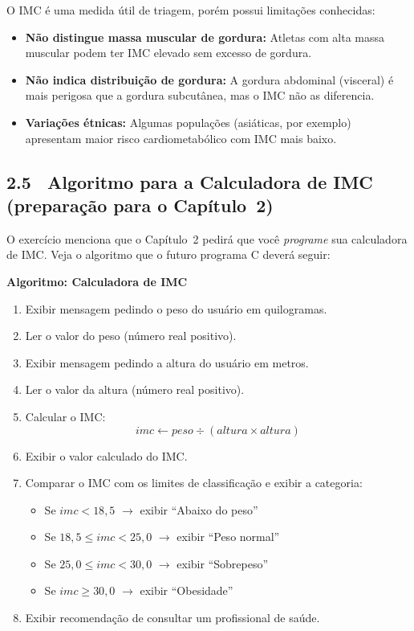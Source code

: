 \documentclass[12pt,a4paper]{article}
\begin{document}
O IMC é uma medida útil de triagem, porém possui limitações conhecidas:
\begin{itemize}
  \item \textbf{Não distingue massa muscular de gordura:} Atletas com alta massa
  muscular podem ter IMC elevado sem excesso de gordura.
  \item \textbf{Não indica distribuição de gordura:} A gordura abdominal (visceral)
  é mais perigosa que a gordura subcutânea, mas o IMC não as diferencia.
  \item \textbf{Variações étnicas:} Algumas populações (asiáticas, por exemplo)
  apresentam maior risco cardiometabólico com IMC mais baixo.
\end{itemize}

\bigskip

\subsection*{2.5 \ Algoritmo para a Calculadora de IMC (preparação para o Capítulo~2)}

O exercício menciona que o Capítulo~2 pedirá que você \textit{programe} sua calculadora
de IMC. Veja o algoritmo que o futuro programa C deverá seguir:

\begin{algoritmo}
\textbf{Algoritmo: Calculadora de IMC}

\begin{enumerate}
  \item Exibir mensagem pedindo o peso do usuário em quilogramas.
  \item Ler o valor do peso (número real positivo).
  \item Exibir mensagem pedindo a altura do usuário em metros.
  \item Ler o valor da altura (número real positivo).
  \item Calcular o IMC:
  \[
    imc \leftarrow peso \div (altura \times altura)
  \]
  \item Exibir o valor calculado do IMC.
  \item Comparar o IMC com os limites de classificação e exibir a categoria:
  \begin{itemize}
    \item Se $imc < 18{,}5$ $\rightarrow$ exibir ``Abaixo do peso''
    \item Se $18{,}5 \leq imc < 25{,}0$ $\rightarrow$ exibir ``Peso normal''
    \item Se $25{,}0 \leq imc < 30{,}0$ $\rightarrow$ exibir ``Sobrepeso''
    \item Se $imc \geq 30{,}0$ $\rightarrow$ exibir ``Obesidade''
  \end{itemize}
  \item Exibir recomendação de consultar um profissional de saúde.
\end{enumerate}
\end{algoritmo}
\end{document}
